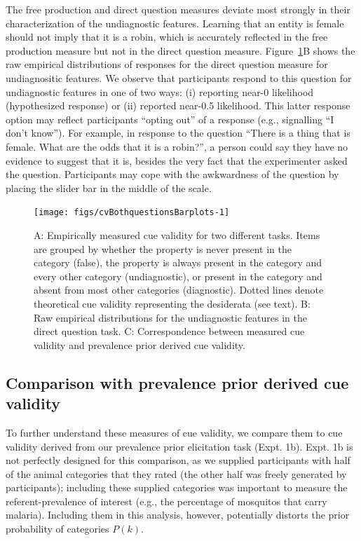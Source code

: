 \documentclass[english,,man,floatsintext]{apa6}
\theoremstyle{definition}
\theoremstyle{definition}
\theoremstyle{definition}
\theoremstyle{remark}
\begin{document}
The free production and direct question measures deviate most strongly
in their characterization of the undiagnostic features. Learning that an
entity is female should not imply that it is a robin, which is
accurately reflected in the free production measure but not in the
direct question measure. Figure~\ref{fig:cvBothquestionsBarplots}B shows
the raw empirical distributions of responses for the direct question
measure for undiagnositic features. We observe that participants respond
to this question for undiagnostic features in one of two ways: (i)
reporting near-0 likelihood (hypothesized response) or (ii) reported
near-0.5 likelihood. This latter response option may reflect
participants \enquote{opting out} of a response (e.g., signalling
\enquote{I don't know}). For example, in response to the question
\enquote{There is a thing that is female. What are the odds that it is a
robin?}, a person could say they have no evidence to suggest that it is,
besides the very fact that the experimenter asked the question.
Participants may cope with the awkwardness of the question by placing
the slider bar in the middle of the scale.

\begin{figure}[!h]
\texttt{[image: figs/cvBothquestionsBarplots-1]} \caption{A: Empirically measured cue validity for two different tasks. Items are grouped by whether the property is never present in the category (false), the property is always present in the category and every other category (undiagnostic), or present in the category and absent from most other categories (diagnostic). Dotted lines denote theoretical cue validity representing the desiderata (see text).  B: Raw empirical distributions for the undiagnostic features in the direct question task. C: Correspondence between measured cue validity and prevalence prior derived cue validity.}\label{fig:cvBothquestionsBarplots}
\end{figure}

\hypertarget{comparison-with-prevalence-prior-derived-cue-validity}{%
\subsection{Comparison with prevalence prior derived cue
validity}\label{comparison-with-prevalence-prior-derived-cue-validity}}

To further understand these measures of cue validity, we compare them to
cue validity derived from our prevalence prior elicitation task (Expt.
1b). Expt. 1b is not perfectly designed for this comparison, as we
supplied participants with half of the animal categories that they rated
(the other half was freely generated by participants); including these
supplied categories was important to measure the referent-prevalence of
interest (e.g., the percentage of mosquitos that carry malaria).
Including them in this analysis, however, potentially distorts the prior
probability of categories \(P(k)\).
\end{document}
